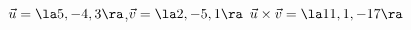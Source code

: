 {$\vec u = \la 5,-4,3\ra$,\quad $\vec v = \la 2,-5,1\ra$
}
{$\vec u\times\vec v = \la 11,1,-17\ra$
}
